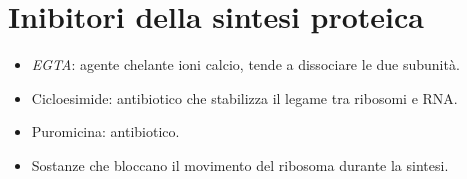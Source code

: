 \section{Inibitori della sintesi proteica}
\begin{multicols}{2}
	\begin{itemize}
		\item \emph{EGTA}: agente chelante ioni calcio, tende a dissociare le due subunit\`a.
		\item Cicloesimide: antibiotico che stabilizza il legame tra ribosomi e RNA.
		\item Puromicina: antibiotico.
		\item Sostanze che bloccano il movimento del ribosoma durante la sintesi.
	\end{itemize}
\end{multicols}
